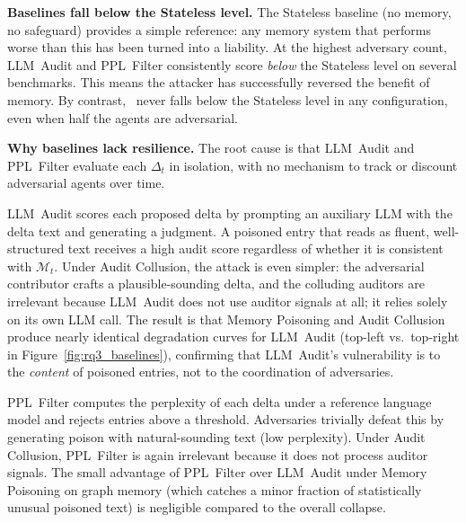 \textbf{Baselines fall below the Stateless level.}
The Stateless baseline (no memory, no safeguard)
provides a simple reference: any memory system that
performs worse than this has been turned into a
liability.  At the highest adversary count,
LLM~Audit and PPL~Filter consistently score
\emph{below} the Stateless level on several
benchmarks.  This means the attacker has
successfully reversed the benefit of memory.  By
contrast, \system\ never falls below the Stateless
level in any configuration, even when half the
agents are adversarial.

\textbf{Why baselines lack resilience.}
The root cause is that LLM~Audit and PPL~Filter
evaluate each $\Delta_t$ in isolation, with no
mechanism to track or discount adversarial agents
over time.

LLM~Audit scores each proposed delta by prompting an
auxiliary LLM with the delta text and generating a
judgment.  A poisoned entry that reads as fluent,
well-structured text receives a high audit score
regardless of whether it is consistent with
$\mathcal{M}_t$.  Under Audit Collusion, the attack
is even simpler: the adversarial contributor crafts a
plausible-sounding delta, and the colluding auditors
are irrelevant because LLM~Audit does not use auditor
signals at all; it relies solely on its own LLM
call.  The result is that Memory Poisoning and Audit
Collusion produce nearly identical degradation curves
for LLM~Audit (top-left vs.\ top-right in
Figure~\ref{fig:rq3_baselines}), confirming that
LLM~Audit's vulnerability is to the \emph{content}
of poisoned entries, not to the coordination of
adversaries.

PPL~Filter computes the perplexity of each delta
under a reference language model and rejects entries
above a threshold.  Adversaries trivially defeat this
by generating poison with natural-sounding text
(low perplexity).  Under Audit Collusion, PPL~Filter
is again irrelevant because it does not process
auditor signals.  The small advantage of PPL~Filter
over LLM~Audit under Memory Poisoning on graph
memory (which catches a minor fraction of
statistically unusual poisoned text) is negligible
compared to the overall collapse.

